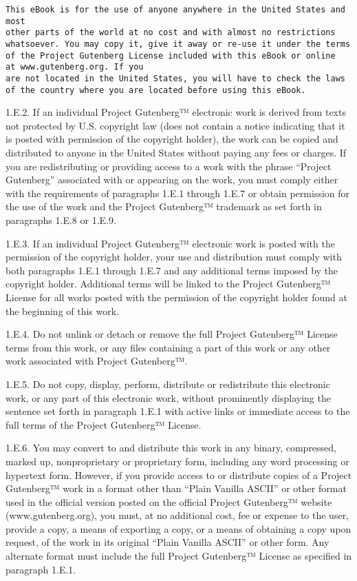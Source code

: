 \begin{verbatim}
This eBook is for the use of anyone anywhere in the United States and most
other parts of the world at no cost and with almost no restrictions
whatsoever. You may copy it, give it away or re-use it under the terms
of the Project Gutenberg License included with this eBook or online
at www.gutenberg.org. If you
are not located in the United States, you will have to check the laws
of the country where you are located before using this eBook.
\end{verbatim}

1.E.2. If an individual Project Gutenberg™ electronic work is derived
from texts not protected by U.S. copyright law (does not contain a
notice indicating that it is posted with permission of the copyright
holder), the work can be copied and distributed to anyone in the United
States without paying any fees or charges. If you are redistributing or
providing access to a work with the phrase ``Project Gutenberg''
associated with or appearing on the work, you must comply either with
the requirements of paragraphs 1.E.1 through 1.E.7 or obtain permission
for the use of the work and the Project Gutenberg™ trademark as set
forth in paragraphs 1.E.8 or 1.E.9.

1.E.3. If an individual Project Gutenberg™ electronic work is posted
with the permission of the copyright holder, your use and distribution
must comply with both paragraphs 1.E.1 through 1.E.7 and any additional
terms imposed by the copyright holder. Additional terms will be linked
to the Project Gutenberg™ License for all works posted with the
permission of the copyright holder found at the beginning of this work.

1.E.4. Do not unlink or detach or remove the full Project Gutenberg™
License terms from this work, or any files containing a part of this
work or any other work associated with Project Gutenberg™.

1.E.5. Do not copy, display, perform, distribute or redistribute this
electronic work, or any part of this electronic work, without
prominently displaying the sentence set forth in paragraph 1.E.1 with
active links or immediate access to the full terms of the Project
Gutenberg™ License.

1.E.6. You may convert to and distribute this work in any binary,
compressed, marked up, nonproprietary or proprietary form, including any
word processing or hypertext form. However, if you provide access to or
distribute copies of a Project Gutenberg™ work in a format other than
``Plain Vanilla ASCII'' or other format used in the official version
posted on the official Project Gutenberg™ website (www.gutenberg.org),
you must, at no additional cost, fee or expense to the user, provide a
copy, a means of exporting a copy, or a means of obtaining a copy upon
request, of the work in its original ``Plain Vanilla ASCII'' or other
form. Any alternate format must include the full Project Gutenberg™
License as specified in paragraph 1.E.1.

